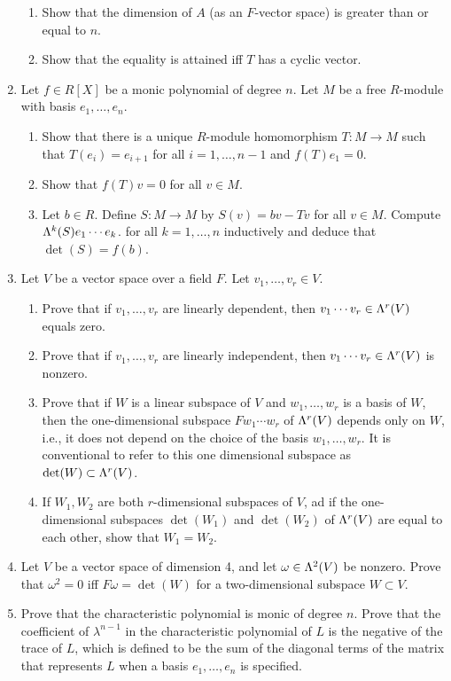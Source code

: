 \documentclass[../psets.tex]{subfiles}
\begin{document}
\begin{enumerate}
    \begin{enumerate}
        \item Show that the dimension of $A$ (as an $F$-vector space) is greater than or equal to $n$.
        \item Show that the equality is attained iff $T$ has a cyclic vector.
    \end{enumerate}
    \item Let $f\in R[X]$ be a monic polynomial of degree $n$. Let $M$ be a free $R$-module with basis $e_1,\dots,e_n$.
    \begin{enumerate}
        \item Show that there is a unique $R$-module homomorphism $T:M\to M$ such that $T(e_i)=e_{i+1}$ for all $i=1,\dots,n-1$ and $f(T)e_1=0$.
        \item Show that $f(T)v=0$ for all $v\in M$.
        \item Let $b\in R$. Define $S:M\to M$ by $S(v)=bv-Tv$ for all $v\in M$. Compute $\lam[k]{S}e_1\cdots e_k$. for all $k=1,\dots,n$ inductively and deduce that $\det(S)=f(b)$.
    \end{enumerate}
    \item Let $V$ be a vector space over a field $F$. Let $v_1,\dots,v_r\in V$.
    \begin{enumerate}
        \item Prove that if $v_1,\dots,v_r$ are linearly dependent, then $v_1\cdots v_r\in\lam[r]{V}$ equals zero.
        \item Prove that if $v_1,\dots,v_r$ are linearly independent, then $v_1\cdots v_r\in\lam[r]{V}$ is nonzero.
        \item Prove that if $W$ is a linear subspace of $V$ and $w_1,\dots,w_r$ is a basis of $W$, then the one-dimensional subspace $Fw_1\cdots w_r$ of $\lam[r]{V}$ depends only on $W$, i.e., it does not depend on the choice of the basis $w_1,\dots,w_r$. It is conventional to refer to this one dimensional subspace as $\det(W)\subset\lam[r]{V}$.
        \item If $W_1,W_2$ are both $r$-dimensional subspaces of $V$, ad if the one-dimensional subspaces $\det(W_1)$ and $\det(W_2)$ of $\lam[r]{V}$ are equal to each other, show that $W_1=W_2$.
    \end{enumerate}
    \item Let $V$ be a vector space of dimension 4, and let $\omega\in\lam[2]{V}$ be nonzero. Prove that $\omega^2=0$ iff $F\omega=\det(W)$ for a two-dimensional subspace $W\subset V$.
    \item Prove that the characteristic polynomial is monic of degree $n$. Prove that the coefficient of $\lambda^{n-1}$ in the characteristic polynomial of $L$ is the negative of the trace of $L$, which is defined to be the sum of the diagonal terms of the matrix that represents $L$ when a basis $e_1,\dots,e_n$ is specified.

\end{enumerate}
\end{document}
